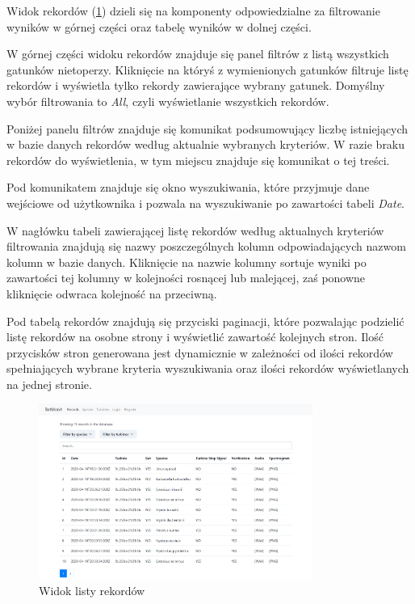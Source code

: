 \documentclass{sprz}
\begin{document}
Widok rekordów (\ref{img:app_records}) dzieli się na komponenty odpowiedzialne za filtrowanie wyników w górnej części oraz tabelę wyników w dolnej części.

W górnej części widoku rekordów znajduje się panel filtrów z listą wszystkich gatunków nietoperzy. Kliknięcie na któryś z wymienionych gatunków filtruje listę rekordów i wyświetla tylko rekordy zawierające wybrany gatunek. Domyślny wybór filtrowania to \textit{All}, czyli wyświetlanie wszystkich rekordów.

Poniżej panelu filtrów znajduje się komunikat podsumowujący liczbę istniejących w bazie danych rekordów według aktualnie wybranych kryteriów. W razie braku rekordów do wyświetlenia, w tym miejscu znajduje się komunikat o tej treści.

Pod komunikatem znajduje się okno wyszukiwania, które przyjmuje dane wejściowe od użytkownika i pozwala na wyszukiwanie po zawartości tabeli \textit{Date}.

W nagłówku tabeli zawierającej listę rekordów według aktualnych kryteriów filtrowania znajdują się nazwy poszczególnych kolumn odpowiadających nazwom kolumn w bazie danych. Kliknięcie na nazwie kolumny sortuje wyniki po zawartości tej kolumny w kolejności rosnącej lub malejącej, zaś ponowne kliknięcie odwraca kolejność na przeciwną.

Pod tabelą rekordów znajdują się przyciski paginacji, które pozwalając podzielić listę rekordów na osobne strony i wyświetlić zawartość kolejnych stron. Ilość przycisków stron generowana jest dynamicznie w zależności od ilości rekordów spełniających wybrane kryteria wyszukiwania oraz ilości rekordów wyświetlanych na jednej stronie.

\begin{figure}[h]
  \centering
  \includegraphics[width=0.8\textwidth]{sprz/app_records}
  \caption{Widok listy rekordów}
  \label{img:app_records}
\end{figure}
\end{document}
